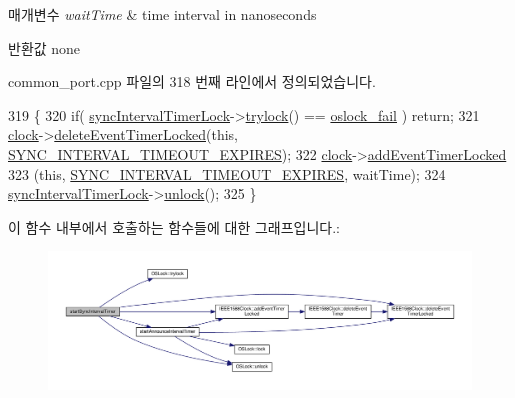 \begin{DoxyParams}{매개변수}
{\em wait\+Time} & time interval in nanoseconds \\
\hline
\end{DoxyParams}
\begin{DoxyReturn}{반환값}
none 
\end{DoxyReturn}


common\+\_\+port.\+cpp 파일의 318 번째 라인에서 정의되었습니다.


\begin{DoxyCode}
319 \{
320     \textcolor{keywordflow}{if}( \hyperlink{class_common_port_a2457c760017e253f1202eb8cfef7c00b}{syncIntervalTimerLock}->\hyperlink{class_o_s_lock_ae98ef550f527786080703feace242487}{trylock}() == 
      \hyperlink{avbts__oslock_8hpp_a6ade377184a937ebffbe2a94b7369a64a7d89b4d4b626b10cd99e6179eb7bedc3}{oslock\_fail} ) \textcolor{keywordflow}{return};
321     \hyperlink{class_common_port_aa2bc8731fa5aeb5b033feebc2b67258c}{clock}->\hyperlink{class_i_e_e_e1588_clock_ab3079a65b0509eeb40c2828fa6a7834a}{deleteEventTimerLocked}(\textcolor{keyword}{this}, 
      \hyperlink{ieee1588_8hpp_a5667b805d857c6d28f83f6038a0272d3a3dba953a3ff5fdac319eca872a7fbc87}{SYNC\_INTERVAL\_TIMEOUT\_EXPIRES});
322     \hyperlink{class_common_port_aa2bc8731fa5aeb5b033feebc2b67258c}{clock}->\hyperlink{class_i_e_e_e1588_clock_a4747f09108bd78ecd68d58dad4358d77}{addEventTimerLocked}
323         (\textcolor{keyword}{this}, \hyperlink{ieee1588_8hpp_a5667b805d857c6d28f83f6038a0272d3a3dba953a3ff5fdac319eca872a7fbc87}{SYNC\_INTERVAL\_TIMEOUT\_EXPIRES}, waitTime);
324     \hyperlink{class_common_port_a2457c760017e253f1202eb8cfef7c00b}{syncIntervalTimerLock}->\hyperlink{class_o_s_lock_a5b965df44250112cac3cf967dc998bec}{unlock}();
325 \}
\end{DoxyCode}


이 함수 내부에서 호출하는 함수들에 대한 그래프입니다.\+:
\nopagebreak
\begin{figure}[H]
\begin{center}
\leavevmode
\includegraphics[width=350pt]{class_common_port_a2033d126c19548eb5ada2d623667e1f2_cgraph}
\end{center}
\end{figure}




